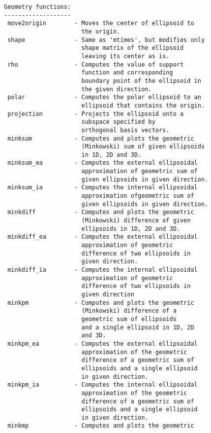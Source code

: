 \begin{enumerate}
\begin{lstlisting}
Geometry functions:
-------------------
 move2origin        - Moves the center of ellipsoid to
                      the origin.
 shape              - Same as 'mtimes', but modifies only
                      shape matrix of the ellipsoid
                      leaving its center as is.
 rho                - Computes the value of support
                      function and corresponding
                      boundary point of the ellipsoid in
                      the given direction.
 polar              - Computes the polar ellipsoid to an
                      ellipsoid that contains the origin.
 projection         - Projects the ellipsoid onto a
                      subspace specified by
                      orthogonal basis vectors.
 minksum            - Computes and plots the geometric
                      (Minkowski) sum of given ellipsoids
                      in 1D, 2D and 3D.
 minksum_ea         - Computes the external ellipsoidal
                      approximation of geometric sum of
                      given ellipsoids in given direction.
 minksum_ia         - Computes the internal ellipsoidal
                      approximation ofgeometric sum of
                      given ellipsoids in given direction.
 minkdiff           - Computes and plots the geometric
                      (Minkowski) difference of given
                      ellipsoids in 1D, 2D and 3D.
 minkdiff_ea        - Computes the external ellipsoidal
                      approximation of geometric
                      difference of two ellipsoids in
                      given direction.
 minkdiff_ia        - Computes the internal ellipsoidal
                      approximation of geometric
                      difference of two ellipsoids in
                      given direction
 minkpm             - Computes and plots the geometric
                      (Minkowski) difference of a
                      geometric sum of ellipsoids
                      and a single ellipsoid in 1D, 2D
                      and 3D.
 minkpm_ea          - Computes the external ellipsoidal
                      approximation of the geometric
                      difference of a geometric sum of
                      ellipsoids and a single ellipsoid
                      in given direction.
 minkpm_ia          - Computes the internal ellipsoidal
                      approximation of the geometric
                      difference of a geometric sum of
                      ellipsoids and a single ellipsoid
                      in given direction.
 minkmp             - Computes and plots the geometric

\end{lstlisting}
\end{enumerate}
